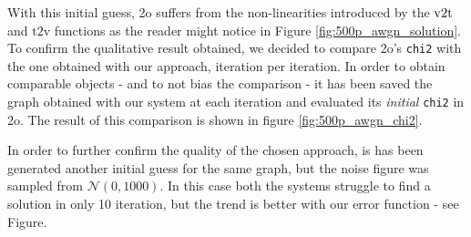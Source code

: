 \noindent With this initial guess, \g2o suffers from the non-linearities introduced by the $\v2t$ and $\text{t2v}$ functions as the reader might notice in Figure \ref{fig:500p_awgn_solution}. To confirm the qualitative result obtained, we decided to compare \g2o's \texttt{chi2} with the one obtained with our approach, iteration per iteration. In order to obtain comparable objects - and to not bias the comparison - it has been saved the graph obtained with our system at each iteration and evaluated its \textit{initial} \texttt{chi2} in \g2o. The result of this comparison is shown in figure \ref{fig:500p_awgn_chi2}.

In order to further confirm the quality of the chosen approach, is has been generated another initial guess for the same graph, but the noise figure was sampled from $\mathcal{N}(0, 1000)$. In this case both the systems struggle to find a solution in only 10 iteration, but the trend is better with our error function - see Figure.




